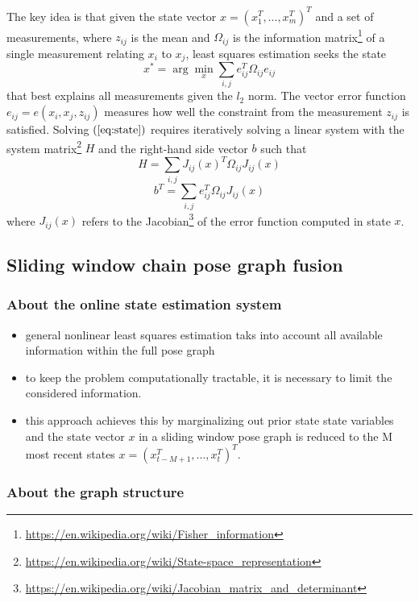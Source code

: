 \documentclass[letterpaper,10pt]{article}
\begin{document}
The key idea is that given the state vector $x=(x_1^T, ..., x_m^T)^T$ and a set of measurements, where $z_{ij}$ is the mean and $\Omega_{ij}$ is the information matrix\footnote{\url{https://en.wikipedia.org/wiki/Fisher_information}} of a single measurement relating $x_i$ to $x_j$, least squares estimation seeks the state
\begin{equation}
x^*=\arg\min_x{\sum_{i,j}e_{ij}^T\Omega_{ij}e_{ij}}
\label{eq:state}
\end{equation}
that best explains all measurements given the $\mathit{l}_2$ norm. The vector error function $e_{ij}=e(x_i,x_j,z_{ij})$ measures how well the constraint from the measurement $z_{ij}$ is satisfied. Solving $(\ref{eq:state})$ requires iteratively solving a linear system with the system matrix\footnote{\url{https://en.wikipedia.org/wiki/State-space_representation}} $H$ and the right-hand side vector $b$ such that
$$H=\sum_{i,j}{J_{ij}(x)^T\Omega_{ij}J_{ij}(x)}$$
$$b^T=\sum_{i,j}e_{ij}^T\Omega_{ij}J_{ij}(x)$$
where $J_{ij}(x)$ refers to the Jacobian\footnote{\url{https://en.wikipedia.org/wiki/Jacobian_matrix_and_determinant}} of the error function computed in state $x$.

\subsection{Sliding window chain pose graph fusion}

\subsubsection{About the online state estimation system}

\begin{itemize}
	\item general nonlinear least squares estimation taks into account all available information within the full pose graph
	\item to keep the problem computationally tractable, it is necessary to limit the considered information.
	\item this approach achieves this by marginalizing out prior state state variables and the state vector $x$ in a sliding window pose graph is reduced to the M most recent states $x=(x_{t-M+1}^T,...,x_t^T)^T$.
\end{itemize}

\subsubsection{About the graph structure}
\end{document}
